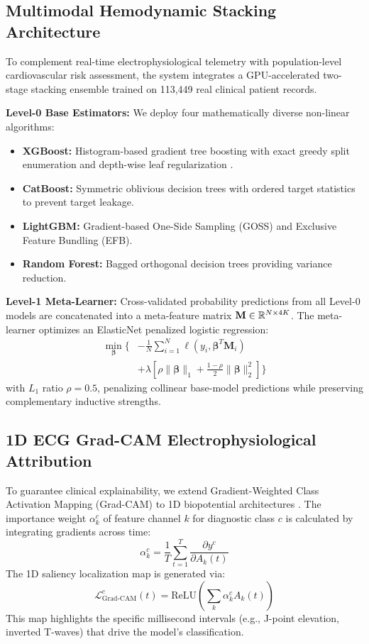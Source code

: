 \subsection{Multimodal Hemodynamic Stacking Architecture}
To complement real-time electrophysiological telemetry with population-level cardiovascular risk assessment, the system integrates a GPU-accelerated two-stage stacking ensemble trained on 113,449 real clinical patient records. 

\textbf{Level-0 Base Estimators:} We deploy four mathematically diverse non-linear algorithms:
\begin{itemize}
    \item \textbf{XGBoost:} Histogram-based gradient tree boosting with exact greedy split enumeration and depth-wise leaf regularization \cite{Chen2016}.
    \item \textbf{CatBoost:} Symmetric oblivious decision trees with ordered target statistics to prevent target leakage.
    \item \textbf{LightGBM:} Gradient-based One-Side Sampling (GOSS) and Exclusive Feature Bundling (EFB).
    \item \textbf{Random Forest:} Bagged orthogonal decision trees providing variance reduction.
\end{itemize}

\textbf{Level-1 Meta-Learner:} Cross-validated probability predictions from all Level-0 models are concatenated into a meta-feature matrix $\mathbf{M} \in \mathbb{R}^{N \times 4K}$. The meta-learner optimizes an ElasticNet penalized logistic regression:
\begin{align}
    \min_{\boldsymbol{\beta}} \bigg\{ & -\frac{1}{N}\sum_{i=1}^N \ell(y_i, \boldsymbol{\beta}^T \mathbf{M}_i) \nonumber \\
    & + \lambda \left[ \rho \|\boldsymbol{\beta}\|_1 + \frac{1-\rho}{2} \|\boldsymbol{\beta}\|_2^2 \right] \bigg\}
\end{align}
with $L_1$ ratio $\rho = 0.5$, penalizing collinear base-model predictions while preserving complementary inductive strengths.

\subsection{1D ECG Grad-CAM Electrophysiological Attribution}
To guarantee clinical explainability, we extend Gradient-Weighted Class Activation Mapping (Grad-CAM) to 1D biopotential architectures \cite{Selvaraju2017}. The importance weight $\alpha_k^c$ of feature channel $k$ for diagnostic class $c$ is calculated by integrating gradients across time:
\begin{equation}
    \alpha_k^c = \frac{1}{T} \sum_{t=1}^T \frac{\partial y^c}{\partial A_k(t)}
\end{equation}
The 1D saliency localization map is generated via:
\begin{equation}
    \mathcal{L}_{\text{Grad-CAM}}^c(t) = \text{ReLU}\left( \sum_k \alpha_k^c A_k(t) \right)
\end{equation}
This map highlights the specific millisecond intervals (e.g., J-point elevation, inverted T-waves) that drive the model's classification.

